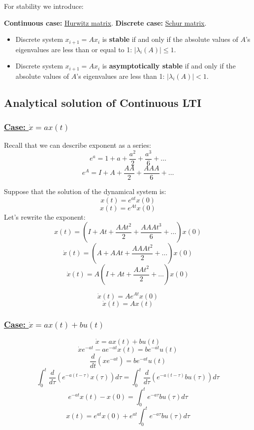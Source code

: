 For stability we introduce:

\textbf{Continuous case:} \underline{Hurwitz matrix}. \textbf{Discrete case:} \underline{Schur matrix}.

\begin{tcolorbox}[colback=green!10,colframe=green!50!black,title=\textbf{Dynamical Systems}]
    \begin{itemize}
        \item Discrete system \(x_{i+1} = Ax_{i}\) is \textbf{stable} if and only if the absolute values of \(A\)'s eigenvalues are less than or equal to 1: \(|\lambda_i(A)| \leq 1\).
        \item Discrete system \(x_{i+1} = Ax_{i}\) is \textbf{asymptotically stable} if and only if the absolute values of \(A\)'s eigenvalues are less than 1: \(|\lambda_i(A)| < 1\).
    \end{itemize}
\end{tcolorbox}

\subsection{Analytical solution of Continuous LTI}

\subsubsection*{\underline{Case: $\dot{x} = ax(t)$}}



Recall that we can describe exponent as a series:
\[e^{a} = 1 + a + \frac{a^2}{2} + \frac{a^3}{6} + \dots\]
\[e^{A} = I + A + \frac{AA}{2} + \frac{AAA}{6} + \dots\]

Suppose that the solution of the dynamical system is:
\[x(t) = e^{at} x(0)\]
\[x(t) = e^{At} x(0)\]
Let's rewrite the exponent:
\[x(t) = (I + At + \frac{AAt^2}{2} + \frac{AAAt^3}{6} + \dots) x(0)\]
\[\dot x(t) = (A + AAt + \frac{AAAt^2}{2} + \dots) x(0)\]
\[\dot x(t) = A(I + At + \frac{AAt^2}{2} + \dots) x(0)\]


\[\dot x(t) = A e^{At} x(0)\]
\[\dot x(t) = A x(t)\]


\subsubsection*{\underline{Case: $\dot{x} = ax(t) + bu(t)$}}


\[
\dot{x} = ax(t) + bu(t)
\]
\[
\dot{x} e^{-at} - ae^{-at} x(t) = b e^{-at} u(t)
\]
\[
\frac{d}{dt} (x e^{-at}) = b e^{-at} u(t)
\]
\[
\int_{0}^{t} \frac{d}{d\tau}(e^{-a(t-\tau)}x(\tau)) d\tau = \int_{0}^{t} \frac{d}{d\tau}(e^{-a(t-\tau)}b u(\tau)) d\tau
\]
\[e^{-at} x(t) - x(0) = \int_{0}^{t} e^{-a\tau} bu(\tau) d\tau\]
\[x(t) = e^{at} x(0) + e^{at} \int_{0}^{t} e^{-a\tau} bu(\tau) d\tau\]

